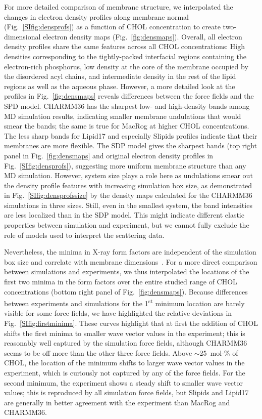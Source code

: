\documentclass[journal=jctcce]{achemso}
\begin{document}
For more detailed comparison of membrane structure, we interpolated the changes in electron density profiles along membrane normal (Fig.~\ref{SIfig:densprofs}) as a function of CHOL concentration to create two-dimensional electron density maps (Fig.~\ref{fig:densmaps}). Overall, all electron density profiles share the same features across all CHOL concentrations: High densities corresponding to the tightly-packed interfacial regions containing the electron-rich phosphorus, low density at the core of the membrane occupied by the disordered acyl chains, and intermediate density in the rest of the lipid regions as well as the aqueous phase. However, a more detailed look at the profiles in Fig.~\ref{fig:densmaps} reveals differences between the force fields and the SPD model. CHARMM36 has the sharpest low- and high-density bands among MD simulation results, indicating smaller membrane undulations that would smear the bands; the same is true for MacRog at higher CHOL concentrations. The less sharp bands for Lipid17 and especially Slipids profiles indicate that their membranes are more flexible. The SDP model gives the sharpest bands (top right panel in Fig.~\ref{fig:densmaps} and original electron density profiles in Fig.~\ref{SIfig:densprofs}), suggesting more uniform membrane structure than any MD simulation. However, system size plays a role here as  undulations smear out the density profile features with increasing simulation box size, as demonstrated in Fig.~\ref{SIfig:densprofssize} by the density maps calculated for the CHARMM36 simulations in three sizes.  Still, even in the smallest system, the band intensities are less localized than in the SDP model. This might indicate different elastic properties between simulation and experiment, but we cannot fully exclude the role of models used to interpret the scattering data.

Nevertheless, the minima in X-ray  form factors are independent of the simulation box size and correlate with membrane dimensions~\cite{NMRlipidsDatabank}. For a more direct comparison between simulations and experiments, we thus interpolated the locations of the first two minima in the form factors over the entire studied range of CHOL concentrations (bottom right panel of Fig.~\ref{fig:densmaps}). Because differences between experiments and simulations for the 1\textsuperscript{st} minimum location are barely visible for some force fields, we have highlighted the relative deviations in Fig.~\ref{SIfig:firstminima}. These curves highlight that at first the addition of CHOL shifts the first minima to smaller wave vector values in the experiment; this is reasonably well captured by the simulation force fields, although CHARMM36 seems to be off more than the other three force fields. Above $\sim$25~mol-\% of CHOL, the location of the minimum shifts to larger wave vector values in the experiment, which is curiously not captured by any of the force fields. For the second minimum, the experiment shows a steady shift to smaller wave vector values; this is reproduced by all simulation force fields, but Slipids and Lipid17 are generally in better agreement with the experiment than MacRog and CHARMM36.
\end{document}
